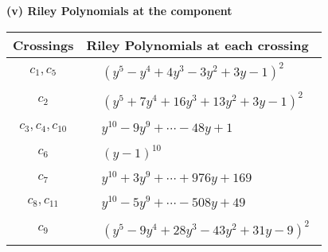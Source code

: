 \documentclass[1p]{elsarticle_modified}
\theoremstyle{definition}
\begin{document}
\newpage\renewcommand{\arraystretch}{1}
\flushleft \textbf{(v) Riley Polynomials at the component}\newline \\
\begin{tabular}{m{50pt}|m{274pt}}
Crossings & \hspace{64pt}Riley Polynomials at each crossing \\
\hline $$\begin{aligned}c_{1},c_{5}\end{aligned}$$&$\begin{aligned}
&(y^5- y^4+4 y^3-3 y^2+3 y-1)^2
\end{aligned}$\\
\hline $$\begin{aligned}c_{2}\end{aligned}$$&$\begin{aligned}
&(y^5+7 y^4+16 y^3+13 y^2+3 y-1)^2
\end{aligned}$\\
\hline $$\begin{aligned}c_{3},c_{4},c_{10}\end{aligned}$$&$\begin{aligned}
&y^{10}-9 y^9+\cdots-48 y+1
\end{aligned}$\\
\hline $$\begin{aligned}c_{6}\end{aligned}$$&$\begin{aligned}
&(y-1)^{10}
\end{aligned}$\\
\hline $$\begin{aligned}c_{7}\end{aligned}$$&$\begin{aligned}
&y^{10}+3 y^9+\cdots+976 y+169
\end{aligned}$\\
\hline $$\begin{aligned}c_{8},c_{11}\end{aligned}$$&$\begin{aligned}
&y^{10}-5 y^9+\cdots-508 y+49
\end{aligned}$\\
\hline $$\begin{aligned}c_{9}\end{aligned}$$&$\begin{aligned}
&(y^5-9 y^4+28 y^3-43 y^2+31 y-9)^2
\end{aligned}$\\
\hline
\end{tabular}\\~\\
\end{document}

